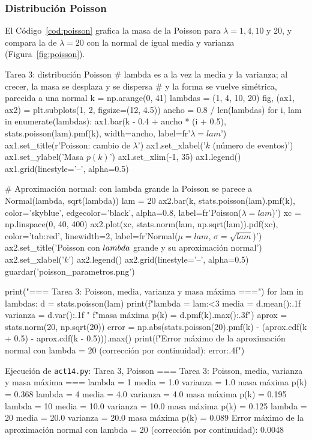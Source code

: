 \documentclass[11pt,letterpaper]{article}
\begin{document}
\subsubsection{Distribución Poisson}

El Código~\ref{cod:poisson} grafica la masa de la Poisson para $\lambda = 1, 4, 10$ y 20, y compara la de $\lambda = 20$ con la normal de igual media y varianza (Figura~\ref{fig:poisson}).

\begin{codigo}[label=cod:poisson]{Tarea 3: distribución Poisson}
# lambda es a la vez la media y la varianza; al crecer, la masa se desplaza y se dispersa
# y la forma se vuelve simétrica, parecida a una normal
k = np.arange(0, 41)
lambdas = (1, 4, 10, 20)
fig, (ax1, ax2) = plt.subplots(1, 2, figsize=(12, 4.5))
ancho = 0.8 / len(lambdas)
for i, lam in enumerate(lambdas):
    ax1.bar(k - 0.4 + ancho * (i + 0.5), stats.poisson(lam).pmf(k), width=ancho,
            label=fr'$\lambda = {lam}$')
ax1.set_title(r'Poisson: cambio de $\lambda$')
ax1.set_xlabel('$k$ (número de eventos)')
ax1.set_ylabel('Masa $p(k)$')
ax1.set_xlim(-1, 35)
ax1.legend()
ax1.grid(linestyle='--', alpha=0.5)

# Aproximación normal: con lambda grande la Poisson se parece a Normal(lambda, sqrt(lambda))
lam = 20
ax2.bar(k, stats.poisson(lam).pmf(k), color='skyblue', edgecolor='black', alpha=0.8,
        label=fr'Poisson($\lambda = {lam}$)')
xc = np.linspace(0, 40, 400)
ax2.plot(xc, stats.norm(lam, np.sqrt(lam)).pdf(xc), color='tab:red', linewidth=2,
         label=fr'Normal($\mu = {lam}$, $\sigma = \sqrt{{{lam}}}$)')
ax2.set_title('Poisson con $\\lambda$ grande y su aproximación normal')
ax2.set_xlabel('$k$')
ax2.legend()
ax2.grid(linestyle='--', alpha=0.5)
guardar('poisson_parametros.png')

print("\n=== Tarea 3: Poisson, media, varianza y masa máxima ===")
for lam in lambdas:
    d = stats.poisson(lam)
    print(f"lambda = {lam:<3} media = {d.mean():.1f}  varianza = {d.var():.1f}  "
          f"masa máxima p(k) = {d.pmf(k).max():.3f}")
aprox = stats.norm(20, np.sqrt(20))
error = np.abs(stats.poisson(20).pmf(k) - (aprox.cdf(k + 0.5) - aprox.cdf(k - 0.5))).max()
print(f"Error máximo de la aproximación normal con lambda = 20 (corrección por continuidad): {error:.4f}")
\end{codigo}

\begin{consola}[label=out:poisson]{Ejecución de \texttt{act14.py}: Tarea 3, Poisson}
=== Tarea 3: Poisson, media, varianza y masa máxima ===
lambda = 1   media = 1.0  varianza = 1.0  masa máxima p(k) = 0.368
lambda = 4   media = 4.0  varianza = 4.0  masa máxima p(k) = 0.195
lambda = 10  media = 10.0  varianza = 10.0  masa máxima p(k) = 0.125
lambda = 20  media = 20.0  varianza = 20.0  masa máxima p(k) = 0.089
Error máximo de la aproximación normal con lambda = 20 (corrección por continuidad): 0.0048
\end{consola}
\end{document}
